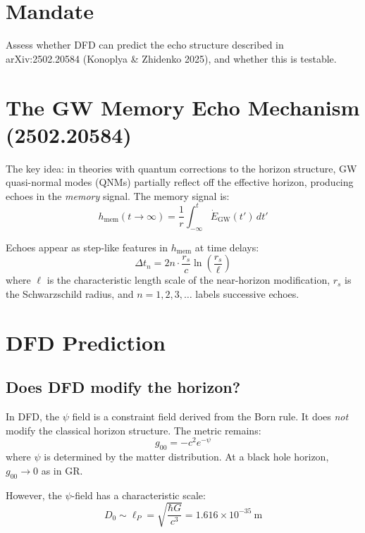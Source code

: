 \documentclass[11pt,a4paper]{article}
\begin{document}
\section{Mandate}

Assess whether DFD can predict the echo structure described in arXiv:2502.20584 (Konoplya \& Zhidenko 2025), and whether this is testable.

\section{The GW Memory Echo Mechanism (2502.20584)}

The key idea: in theories with quantum corrections to the horizon structure, GW quasi-normal modes (QNMs) partially reflect off the effective horizon, producing echoes in the \emph{memory} signal. The memory signal is:
\begin{equation}
h_{\text{mem}}(t \to \infty) = \frac{1}{r} \int_{-\infty}^{t} \dot{E}_{\text{GW}}(t') \, dt'
\end{equation}

Echoes appear as step-like features in $h_{\text{mem}}$ at time delays:
\begin{equation}
\Delta t_n = 2n \cdot \frac{r_s}{c} \ln\left(\frac{r_s}{\ell}\right)
\end{equation}
where $\ell$ is the characteristic length scale of the near-horizon modification, $r_s$ is the Schwarzschild radius, and $n = 1, 2, 3, \ldots$ labels successive echoes.

\section{DFD Prediction}

\subsection{Does DFD modify the horizon?}

In DFD, the $\psi$ field is a constraint field derived from the Born rule. It does \emph{not} modify the classical horizon structure. The metric remains:
\begin{equation}
g_{00} = -c^2 e^{-\psi}
\end{equation}
where $\psi$ is determined by the matter distribution. At a black hole horizon, $g_{00} \to 0$ as in GR.

However, the $\psi$-field has a characteristic scale:
\begin{equation}
D_0 \sim \ell_P = \sqrt{\frac{\hbar G}{c^3}} = 1.616 \times 10^{-35}~\text{m}
\end{equation}
\end{document}

